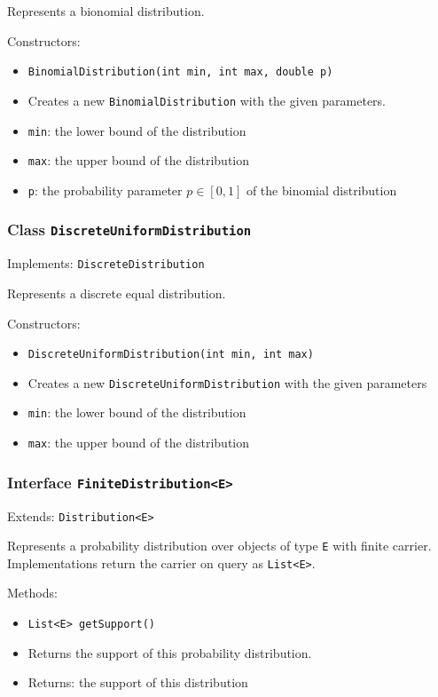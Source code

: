 \documentclass[parskip=full,11pt]{scrartcl}
\begin{document}
Represents a bionomial distribution.

Constructors:
\begin{itemize}\itemsep -10pt
\item \texttt{BinomialDistribution(int min, int max, double p)}
\item[] Creates a new \texttt{BinomialDistribution} with the given parameters.
\item[] \texttt{min}: the lower bound of the distribution
\item[] \texttt{max}: the upper bound of the distribution
\item[] \texttt{p}: the probability parameter \(p \in [0,1]\) of the binomial distribution
\end{itemize}

\subsubsection{Class \texttt{DiscreteUniformDistribution}}
Implements: \texttt{DiscreteDistribution}

Represents a discrete equal distribution.

Constructors:
\begin{itemize}\itemsep -10pt
\item \texttt{DiscreteUniformDistribution(int min, int max)}
\item[] Creates a new \texttt{DiscreteUniformDistribution} with the given parameters
\item[] \texttt{min}: the lower bound of the distribution
\item[] \texttt{max}: the upper bound of the distribution
\end{itemize}

\subsubsection{Interface \texttt{FiniteDistribution<E>}}
Extends: \texttt{Distribution<E>}


Represents a probability distribution over objects of type \texttt{E} with finite carrier. Implementations return the carrier on query as \texttt{List<E>}.

Methods:
\begin{itemize}\itemsep -10pt
\item \texttt{List<E> getSupport()}
\item[] Returns the support of this probability distribution.
\item[] Returns: the support of this distribution
\end{itemize}
\end{document}

